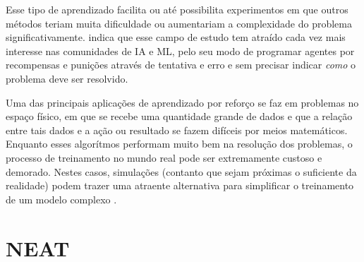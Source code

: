 

Esse tipo de aprendizado facilita ou at{\'e} possibilita experimentos
em que outros m{\'e}todos teriam muita dificuldade ou aumentariam a
complexidade do problema significativamente.
 indica que esse campo de estudo
tem atra{\'i}do cada vez mais interesse nas comunidades de IA e ML,
pelo seu modo de programar agentes por recompensas e puni{\c c}{\~o}es
atrav{\'e}s de tentativa e erro e sem precisar indicar \textit{como} o
problema deve ser resolvido.

Uma das principais aplica{\c c}{\~o}es de aprendizado por refor{\c c}o
se faz em problemas no espa{\c c}o f{\'i}sico, em que se recebe uma
quantidade grande de dados e que a rela{\c c}{\~a}o entre tais dados e
a a{\c c}{\~a}o ou resultado se fazem dif{\'i}ceis por meios
matem{\'a}ticos. Enquanto esses algor{\'i}tmos performam muito bem na
resolu{\c c}{\~a}o dos problemas, o processo de treinamento no mundo
real pode ser extremamente custoso e demorado. Nestes casos, simula{\c
  c}{\~o}es (contanto que sejam pr{\'o}ximas o suficiente da
realidade) podem trazer uma atraente alternativa para simplificar o
treinamento de um modelo complexo \cite{Rao_2020_CVPR}.

\section{NEAT}

\lipsum[6-8]

